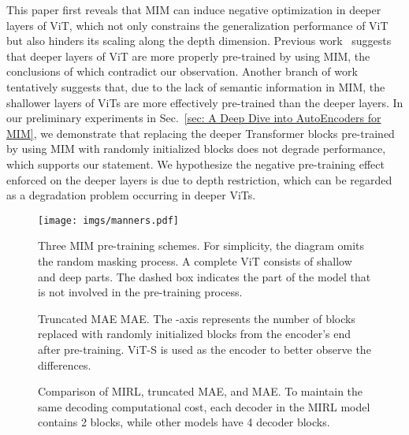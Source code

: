 \documentclass{article}
\begin{document}
This paper first reveals that MIM can induce negative optimization in deeper layers of ViT, which not only constrains the generalization performance of ViT but also hinders its scaling along the depth dimension.
Previous work~\cite{xie2022revealing,ren2023deepmim} suggests that deeper layers of ViT are more properly pre-trained by using MIM, the conclusions of which contradict our observation.  
Another branch of work~\cite{chen2022sdae,wang2022closer,chen2022context,jiang2023layer,ren2023deepmim} tentatively suggests that, due to the lack of semantic information in MIM, the shallower layers of ViTs are more effectively pre-trained than the deeper layers.
In our preliminary experiments in Sec.~\ref{sec: A Deep Dive into AutoEncoders for MIM}, we demonstrate that replacing the deeper Transformer blocks pre-trained by using MIM with randomly initialized blocks does not degrade performance, which supports our statement.
We hypothesize the negative pre-training effect enforced on the deeper layers is due to depth restriction, which can be regarded as a degradation problem occurring in deeper ViTs.
\begin{figure}[!t]
\begin{center}
\texttt{[image: imgs/manners.pdf]}
\end{center}
\caption{Three MIM pre-training schemes. 
For simplicity, the diagram omits the random masking process.
A complete ViT consists of shallow and deep parts. The dashed box indicates the part of the model that is not involved in the pre-training process. 
}
\label{fig: manners}
\end{figure}

\begin{figure}
\flushleft 
  \begin{floatrow}
    {\vspace{0pt}\caption{\label{fig: taevsmae}Truncated MAE \vs MAE.
The -axis represents the number of blocks replaced with randomly initialized blocks from the encoder's end after pre-training. ViT-S is used as the encoder to better observe the differences.
}}
    {\vspace{0pt}\caption{\label{fig: ae_variants}Comparison of MIRL, truncated MAE, and MAE. To maintain the same decoding computational cost, each decoder in the MIRL model contains 2 blocks, while other models have 4 decoder blocks.}}
    
  \end{floatrow}
\end{figure}
\end{document}
